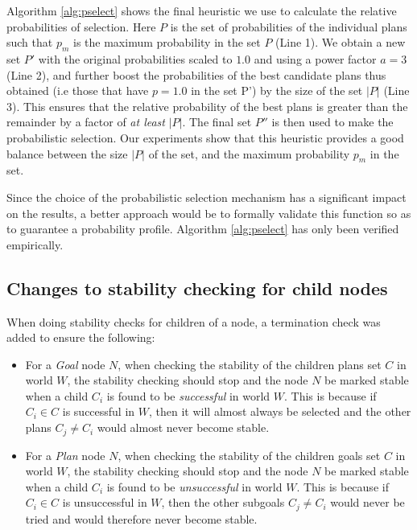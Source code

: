 \documentclass[a4paper]{article}
\begin{document}
Algorithm \ref{alg:pselect} shows the final heuristic we use to calculate the relative probabilities of selection. Here $P$ is the set of probabilities of the individual plans such that $p_m$ is the maximum probability in the set $P$ (Line 1). We obtain a new set $P'$ with the original probabilities scaled to $1.0$ and using a power factor $a=3$ (Line 2), and further boost the probabilities of the best candidate plans thus obtained (i.e those that have  $p=1.0$ in the set P') by the size of the set $|P|$ (Line 3). This ensures that the relative probability of the best plans is greater than the remainder by a factor of \textit{at least} $|P|$. The final set $P''$ is then used to make the probabilistic selection. Our experiments show that this heuristic provides a good balance between the size $|P|$ of the set, and the maximum probability $p_m$ in the set.

Since the choice of the probabilistic selection mechanism has a significant impact on the results, a better approach would be to formally validate this function so as to guarantee a probability profile. Algorithm \ref{alg:pselect} has only been verified empirically.

\subsection{Changes to stability checking for child nodes}
\label{subsec:stability-fixes}

When doing stability checks for children of a node, a termination check was added to ensure the following:

\begin{itemize}
\item For a \textit{Goal} node $N$, when checking the stability of the children plans set $C$ in world $W$, the stability checking should stop and the node $N$ be marked stable when a child $C_i$ is found to be \textit{successful} in world $W$. This is because if $C_i \in C$ is successful in $W$, then it will almost always be selected and the other plans $C_j \neq C_i$ would almost never become stable.
\item For a \textit{Plan} node $N$, when checking the stability of the children goals set $C$ in world $W$, the stability checking should stop and the node $N$ be marked stable when a child $C_i$ is found to be \textit{unsuccessful} in world $W$. This is because if $C_i \in C$ is unsuccessful in $W$, then the other subgoals $C_j \neq C_i$ would never be tried and would therefore never become stable.

\end{itemize}
\end{document}
